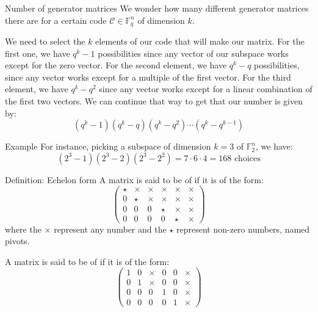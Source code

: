 \documentclass[a4paper]{article}
\begin{document}
\begin{parag}{Number of generator matrices}
    We wonder how many different generator matrices there are for a certain code $\mathcal{C} \in \mathbb{F}_q^n$ of dimension $k$.

    We need to select the $k$ elements of our code that will make our matrix. For the first one, we have $q^k - 1$ possibilities since any vector of our subspace works except for the zero vector. For the second element, we have $q^k - q$ possibilities, since any vector works except for a multiple of the first vector. For the third element, we have $q^k - q^2$ since any vector works except for a linear combination of the first two vectors. We can continue that way to get that our number is given by: 
    \[\left(q^k - 1\right)\left(q^k - q\right)\left(q^k - q^2\right)\cdots\left(q^k - q^{k-1}\right)\]

    \begin{subparag}{Example}
        For instance, picking a subspace of dimension $k = 3$ of $\mathbb{F}_2^n$, we have: 
        \[\left(2^3 - 1\right)\left(2^3 - 2\right)\left(2^3 - 2^2\right) = 7\cdot 6\cdot 4 = 168 \text{ choices}\]
    \end{subparag}
    
\end{parag}

\begin{parag}{Definition: Echelon form}
    A matrix is said to be of  if it is of the form: 
    \[\begin{pmatrix} \star & \times & \times & \times & \times & \times \\ 0 & \star & \times & \times & \times & \times \\ 0 & 0 & 0 & \star & \times & \times \\ 0 & 0 & 0 & 0 & \star & \times \end{pmatrix} \]
    where the $\times$ represent any number and the $\star$ represent non-zero numbers, named pivots.

    A matrix is said to be of  if it is of the form:
    \[\begin{pmatrix} 1 & 0 & \times & 0 & 0 & \times \\ 0 & 1 & \times & 0 & 0 & \times \\ 0 & 0 & 0 & 1 & 0 & \times \\ 0 & 0 & 0 & 0 & 1 & \times \end{pmatrix}\]
\end{parag}
\end{document}
